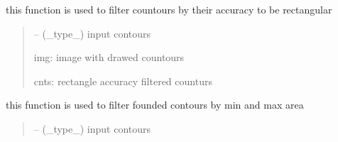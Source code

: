 \documentclass[letterpaper,10pt,english]{sphinxmanual}
\begin{document}
\begin{savenotes}
\begin{fulllineitems}
\begin{savenotes}
\begin{fulllineitems}
\begin{quote}
\begin{description}
\end{description}\end{quote}

\end{fulllineitems}\end{savenotes}


\begin{savenotes}\begin{fulllineitems}
\label{\detokenize{setting/backend/pxvalue_calibration:oxin.backend.pxvalue_calibration.extract_info.filter_contours_by_accuracy}}
\pysigstartsignatures
{}
\pysigstopsignatures
\sphinxAtStartPar
this function is used to filter countours by their accuracy to be rectangular
\begin{quote}\begin{description}
\sphinxAtStartPar
{} – (\_type\_) input contours

\sphinxAtStartPar
img: image with drawed countours

\sphinxAtStartPar
cnts: rectangle accuracy filtered counturs

\end{description}\end{quote}

\end{fulllineitems}\end{savenotes}


\begin{savenotes}\begin{fulllineitems}
\label{\detokenize{setting/backend/pxvalue_calibration:oxin.backend.pxvalue_calibration.extract_info.filter_contours_by_area}}
\pysigstartsignatures
{}
\pysigstopsignatures
\sphinxAtStartPar
this function is used to filter founded contours by min and max area
\begin{quote}\begin{description}
\sphinxAtStartPar
{} – (\_type\_) input contours


\end{description}
\end{quote}
\end{fulllineitems}
\end{savenotes}
\end{fulllineitems}
\end{savenotes}
\end{document}
